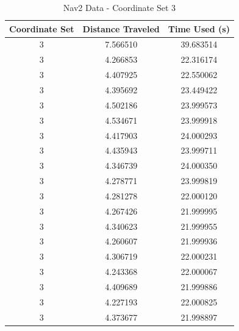 \documentclass[%
paper=A4,               %
twoside=true,           %
openright,              %
11pt,                   %
bibliography=totoc,     %
titlepage=on,           %
DIV=12,                 %
BCOR=1.5cm,             %
parskip=half,            %
final
]{scrreprt}
\begin{document}
	\begin{table}[h!]
		\centering
		\begin{tabular}{|c|c|c|}
			\hline
			Coordinate Set & Distance Traveled & Time Used (s) \\
			\hline
			3 & 7.566510 & 39.683514 \\
			3 & 4.266853 & 22.316174 \\
			3 & 4.407925 & 22.550062 \\
			3 & 4.395692 & 23.449422 \\
			3 & 4.502186 & 23.999573 \\
			3 & 4.534671 & 23.999918 \\
			3 & 4.417903 & 24.000293 \\
			3 & 4.435943 & 23.999711 \\
			3 & 4.346739 & 24.000350 \\
			3 & 4.278771 & 23.999819 \\
			3 & 4.281278 & 22.000120 \\
			3 & 4.267426 & 21.999995 \\
			3 & 4.340623 & 21.999955 \\
			3 & 4.260607 & 21.999936 \\
			3 & 4.306719 & 22.000231 \\
			3 & 4.243368 & 22.000067 \\
			3 & 4.409689 & 21.999886 \\
			3 & 4.227193 & 22.000825 \\
			3 & 4.373677 & 21.998897 \\
			\hline
		\end{tabular}
		\caption{Nav2 Data - Coordinate Set 3}
		\label{tab:4}
	\end{table}
	
\end{document}

